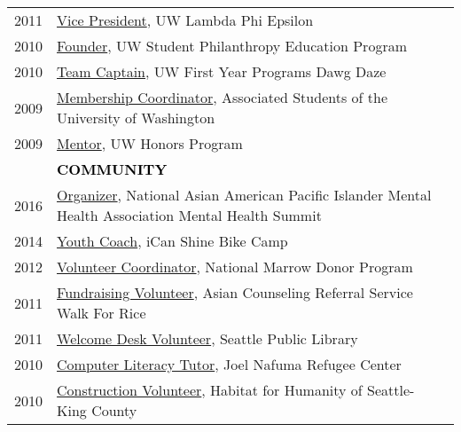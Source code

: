 \documentclass[11pt]{article}
\begin{document}
{{\begin{longtable}{Rp{0.75in}p{5.0in}}
\footnotesize{2011} & \href{https://www.dailyuw.com/features/article_107d7a3a-3bec-5989-b8ae-56bd4afd0c89.html}{{Vice President}}, UW Lambda Phi Epsilon\\

\footnotesize{2010} & \href{https://www.washington.edu/giving/get-involved/for-students/real-dawgs-give-back/}{{Founder}}, UW Student Philanthropy Education Program\\

\footnotesize{2010} & \href{http://www.uwdawgdaze.com/}{{Team Captain}}, UW First Year Programs Dawg Daze\\

\footnotesize{2009} & \href{https://www.dailyuw.com/news/article_05df45ba-6f0b-5612-964e-ab318f36b612.html}{{Membership Coordinator}}, Associated Students of the University of Washington\\

\footnotesize{2009} & \href{https://honors.uw.edu/community/grads/12_13/}{{Mentor}}, UW Honors Program\\

& \textcolor{black}{\uppercase{\textbf{Community}}}\\

\footnotesize{2016} & \href{https://www.facebook.com/events/215634702135825/}{{Organizer}}, National Asian American Pacific Islander Mental Health Association Mental Health Summit\\

\footnotesize{2014} & \href{https://icanshine.org/}{{Youth Coach}}, iCan Shine Bike Camp\\

\footnotesize{2012} & \href{http://www.dailyuw.com/news/article_de3524ce-3d5e-5dd2-8de7-5deebee463d9.html}{{Volunteer Coordinator}}, National Marrow Donor Program\\

\footnotesize{2011} & \href{https://acrs.org/events/walk-for-rice/}{{Fundraising Volunteer}}, Asian Counseling Referral Service Walk For Rice\\

\footnotesize{2011} & \href{https://www.spl.org}{{Welcome Desk Volunteer}}, Seattle Public Library\\

\footnotesize{2010} & \href{https://www.habitatskc.org/}{{Computer Literacy Tutor}}, Joel Nafuma Refugee Center\\

\footnotesize{2010} & \href{https://www.habitatskc.org/}{{Construction Volunteer}}, Habitat for Humanity of Seattle-King County\\


\end{longtable}}}
\end{document}
